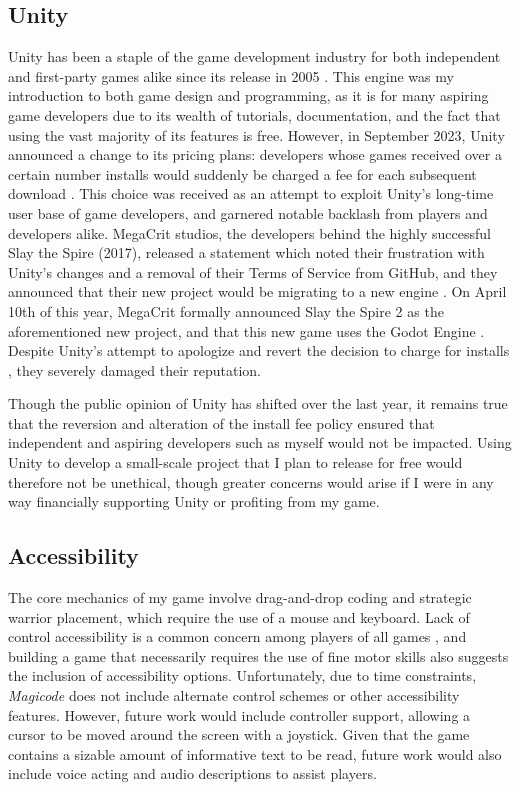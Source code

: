 \documentclass[10pt,twocolumn]{article}
\begin{document}
\subsection{Unity}
Unity has been a staple of the game development industry for both independent and first-party games alike since its release in 2005 \cite{unity-website}. This engine was my introduction to both game design and programming, as it is for many aspiring game developers due to its wealth of tutorials, documentation, and the fact that using the vast majority of its features is free. However, in September 2023, Unity announced a change to its pricing plans: developers whose games received over a certain number installs would suddenly be charged a fee for each subsequent download \cite{unity-deleted-post}. This choice was received as an attempt to exploit Unity’s long-time user base of game developers, and garnered notable backlash from players and developers alike. MegaCrit studios, the developers behind the highly successful Slay the Spire (2017), released a statement which noted their frustration with Unity’s changes and a removal of their Terms of Service from GitHub, and they announced that their new project would be migrating to a new engine \cite{sts-tweet}. On April 10th of this year, MegaCrit formally announced Slay the Spire 2 as the aforementioned new project, and that this new game uses the Godot Engine \cite{slay-the-spire-steam}. Despite Unity’s attempt to apologize and revert the decision to charge for installs \cite{unity-runtime-pricing}, they severely damaged their reputation.

Though the public opinion of Unity has shifted over the last year, it remains true that the reversion and alteration of the install fee policy ensured that independent and aspiring developers such as myself would not be impacted. Using Unity to develop a small-scale project that I plan to release for free would therefore not be unethical, though greater concerns would arise if I were in any way financially supporting Unity or profiting from my game.

\subsection{Accessibility}
The core mechanics of my game involve drag-and-drop coding and strategic warrior placement, which require the use of a mouse and keyboard. Lack of control accessibility is a common concern among players of all games \cite{ground-floor-accessibility}, and building a game that necessarily requires the use of fine motor skills also suggests the inclusion of accessibility options. Unfortunately, due to time constraints, \textit{Magicode} does not include alternate control schemes or other accessibility features. However, future work would include controller support, allowing a cursor to be moved around the screen with a joystick. Given that the game contains a sizable amount of informative text to be read, future work would also include voice acting and audio descriptions to assist players.
\end{document}
